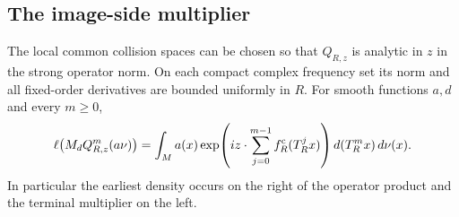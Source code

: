 \subsection{The image-side multiplier}
\begin{lemma}
\label{lem:backward-flight-multiplier}
The local common collision spaces can be chosen so that $Q_{R,z}$ is
analytic in $z$ in the strong operator norm. On each compact complex
frequency set its norm and all fixed-order derivatives are bounded
uniformly in $R$. For smooth functions $a,d$ and every $m\ge0$,
\begin{equation}\label{eq:exact-collision-endpoint-pairing}
 \ell\bigl(M_d Q_{R,z}^{m}(a\nu)\bigr)
 =\int_M a(x)\exp\!\left(i z\cdot\sum_{j=0}^{m-1}
                  f_R^{\rm c}(T_R^j x)\right)d(T_R^m x)\,d\nu(x).
\end{equation}
In particular the earliest density occurs on the right of the operator
product and the terminal multiplier on the left.
\end{lemma}
